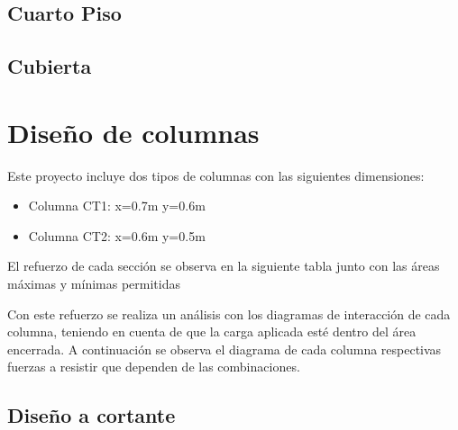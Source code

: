 \documentclass[12pt]{article}
\begin{document}
\newpage
\subsection*{Cuarto Piso}











\newpage
\subsection*{Cubierta}












\section{Diseño de columnas}

Este proyecto incluye dos tipos de columnas con las siguientes dimensiones:
\begin{itemize}
    \item Columna CT1: x=0.7m y=0.6m
    \item Columna CT2: x=0.6m y=0.5m
\end{itemize}

El refuerzo de cada sección se observa en la siguiente tabla junto con las áreas máximas y mínimas permitidas



Con este refuerzo se realiza un análisis con los diagramas de interacción de cada columna, teniendo en cuenta de que la carga aplicada esté dentro del área encerrada. A continuación se observa el diagrama de cada columna respectivas fuerzas a resistir que dependen de las combinaciones.



\subsection{Diseño a cortante}
\end{document}
